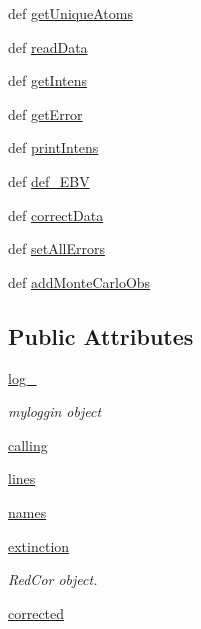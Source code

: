 \begin{DoxyCompactItemize}
def \hyperlink{classpyneb_1_1core_1_1pynebcore_1_1_observation_a786ab364c468b851c4438354235e988a}{get\-Unique\-Atoms}
\item 
def \hyperlink{classpyneb_1_1core_1_1pynebcore_1_1_observation_aa33f35ce2f56f5b8a5666601b24a1107}{read\-Data}
\item 
def \hyperlink{classpyneb_1_1core_1_1pynebcore_1_1_observation_ac380b22660411926b90f935f5123494b}{get\-Intens}
\item 
def \hyperlink{classpyneb_1_1core_1_1pynebcore_1_1_observation_a96cf2360b9b568a675d2c8177d47b3d2}{get\-Error}
\item 
def \hyperlink{classpyneb_1_1core_1_1pynebcore_1_1_observation_aa3d4a178539eaf7fe431ef1dbd347430}{print\-Intens}
\item 
def \hyperlink{classpyneb_1_1core_1_1pynebcore_1_1_observation_ab01150e82809bd712a1b1f09d250db94}{def\-\_\-\-E\-B\-V}
\item 
def \hyperlink{classpyneb_1_1core_1_1pynebcore_1_1_observation_a823a1fa51f042f2734cbc323c6a7d4bb}{correct\-Data}
\item 
def \hyperlink{classpyneb_1_1core_1_1pynebcore_1_1_observation_a2c0cec305d120daeeb9857c979fbec85}{set\-All\-Errors}
\item 
def \hyperlink{classpyneb_1_1core_1_1pynebcore_1_1_observation_a8005a1ad8167e96e117d4b81d6e919ff}{add\-Monte\-Carlo\-Obs}
\end{DoxyCompactItemize}
\subsection*{Public Attributes}
\begin{DoxyCompactItemize}
\item 
\hyperlink{classpyneb_1_1core_1_1pynebcore_1_1_observation_a882b7909bc881e0c212dd5085305f4d4}{log\-\_\-}
\begin{DoxyCompactList}\small\item\em myloggin object \end{DoxyCompactList}\item 
\hyperlink{classpyneb_1_1core_1_1pynebcore_1_1_observation_a2639fad9af4fefad20e4097295bd40e7}{calling}
\item 
\hyperlink{classpyneb_1_1core_1_1pynebcore_1_1_observation_a78332043ca9f290590edf6b8a1e5b767}{lines}
\item 
\hyperlink{classpyneb_1_1core_1_1pynebcore_1_1_observation_a3f365d0b1488b2eba300bf71caf23c17}{names}
\item 
\hyperlink{classpyneb_1_1core_1_1pynebcore_1_1_observation_acdd6227c32bd92ec4a15b83110bcb570}{extinction}
\begin{DoxyCompactList}\small\item\em Red\-Cor object. \end{DoxyCompactList}\item 
\hyperlink{classpyneb_1_1core_1_1pynebcore_1_1_observation_a7eef3176d082009fa850a9d364d44625}{corrected}
\end{DoxyCompactItemize}
